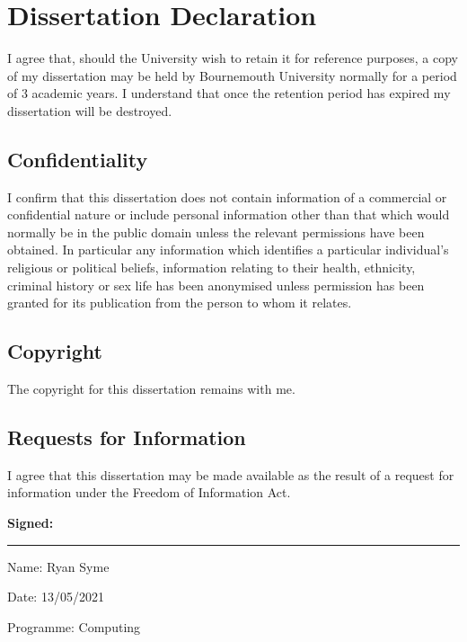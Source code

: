 \chapter*{Dissertation Declaration}
\thispagestyle{fancy} %

%
\color{black}

{\linespread{1.0} %
I agree that, should the University wish to retain it for reference purposes, a copy of my dissertation may be held by Bournemouth University normally for a period of 3 academic years. I understand that once the retention period has expired my dissertation will be destroyed.

\section*{Confidentiality}
I confirm that this dissertation does not contain information of a commercial or confidential nature or include personal information other than that which would normally be in the public domain unless the relevant permissions have been obtained. In particular any information which identifies a particular individual's religious or political beliefs, information relating to their health, ethnicity, criminal history or sex life has been anonymised unless permission has been granted for its publication from the person to whom it relates.

\section*{Copyright}
The copyright for this dissertation remains with me.

\section*{Requests for Information}
I agree that this dissertation may be made available as the result of a request for information under the Freedom of Information Act.


\vspace{12pt}
\textbf{Signed:}
\hrule width 0.7\textwidth
\vspace{12pt}

Name: Ryan Syme
\vspace{3pt}

Date: 13/05/2021
\vspace{3pt}

Programme: Computing
\vspace{3pt}

}







